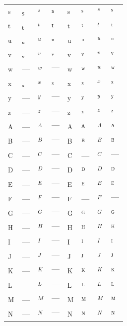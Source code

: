 \documentclass{standalone}
\begin{document}
\begin{tabular}{ll|ll|ll|ll}
\textsubscript{s} & ₛ & $_{s}$ & $ₛ$ & \textsuperscript{s} & ˢ & $^{s}$ & $ˢ$ \\
\textsubscript{t} & ₜ & $_{t}$ & $ₜ$ & \textsuperscript{t} & ᵗ & $^{t}$ & $ᵗ$ \\
\textsubscript{u} & ᵤ & $_{u}$ & $ᵤ$ & \textsuperscript{u} & ᵘ & $^{u}$ & $ᵘ$ \\
\textsubscript{v} & ᵥ & $_{v}$ & $ᵥ$ & \textsuperscript{v} & ᵛ & $^{v}$ & $ᵛ$ \\
\textsubscript{w} & — & $_{w}$ & $—$ & \textsuperscript{w} & ʷ & $^{w}$ & $ʷ$ \\
\textsubscript{x} & ₓ & $_{x}$ & $ₓ$ & \textsuperscript{x} & ˣ & $^{x}$ & $ˣ$ \\
\textsubscript{y} & — & $_{y}$ & $—$ & \textsuperscript{y} & ʸ & $^{y}$ & $ʸ$ \\
\textsubscript{z} & — & $_{z}$ & $—$ & \textsuperscript{z} & ᶻ & $^{z}$ & $ᶻ$ \\
\midrule
\textsubscript{A} & — & $_{A}$ & $—$ & \textsuperscript{A} & ᴬ & $^{A}$ & $ᴬ$ \\
\textsubscript{B} & — & $_{B}$ & $—$ & \textsuperscript{B} & ᴮ & $^{B}$ & $ᴮ$ \\
\textsubscript{C} & — & $_{C}$ & $—$ & \textsuperscript{C} & — & $^{C}$ & $—$ \\
\textsubscript{D} & — & $_{D}$ & $—$ & \textsuperscript{D} & ᴰ & $^{D}$ & $ᴰ$ \\
\textsubscript{E} & — & $_{E}$ & $—$ & \textsuperscript{E} & ᴱ & $^{E}$ & $ᴱ$ \\
\textsubscript{F} & — & $_{F}$ & $—$ & \textsuperscript{F} & — & $^{F}$ & $—$ \\
\textsubscript{G} & — & $_{G}$ & $—$ & \textsuperscript{G} & ᴳ & $^{G}$ & $ᴳ$ \\
\textsubscript{H} & — & $_{H}$ & $—$ & \textsuperscript{H} & ᴴ & $^{H}$ & $ᴴ$ \\
\textsubscript{I} & — & $_{I}$ & $—$ & \textsuperscript{I} & ᴵ & $^{I}$ & $ᴵ$ \\
\textsubscript{J} & — & $_{J}$ & $—$ & \textsuperscript{J} & ᴶ & $^{J}$ & $ᴶ$ \\
\textsubscript{K} & — & $_{K}$ & $—$ & \textsuperscript{K} & ᴷ & $^{K}$ & $ᴷ$ \\
\textsubscript{L} & — & $_{L}$ & $—$ & \textsuperscript{L} & ᴸ & $^{L}$ & $ᴸ$ \\
\textsubscript{M} & — & $_{M}$ & $—$ & \textsuperscript{M} & ᴹ & $^{M}$ & $ᴹ$ \\
\textsubscript{N} & — & $_{N}$ & $—$ & \textsuperscript{N} & ᴺ & $^{N}$ & $ᴺ$ \\

\end{tabular}
\end{document}
